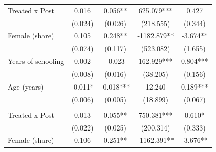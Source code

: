 \begin{table}[H]
{\begin{threeparttable}
\begin{tabular}[t]{lcccc}
        \hspace{1em}Treated x Post     & 0.016                 & 0.056**                        & 625.079***             & 0.427                       \\
        \hspace{1em}                   & (0.024)               & (0.026)                        & (218.555)              & (0.344)                     \\
        \hspace{1em}Female (share)     & 0.105                 & 0.248**                        & -1182.879**            & -3.674**                    \\
        \hspace{1em}                   & (0.074)               & (0.117)                        & (523.082)              & (1.655)                     \\
        \hspace{1em}Years of schooling & 0.002                 & -0.023                         & 162.929***             & 0.804***                    \\
        \hspace{1em}                   & (0.008)               & (0.016)                        & (38.205)               & (0.156)                     \\
        \hspace{1em}Age (years)        & -0.011*               & -0.018***                      & 12.240                 & 0.189***                    \\
        \hspace{1em}                   & (0.006)               & (0.005)                        & (18.899)               & (0.067)                     \\
        \addlinespace[0.3em]
        \multicolumn{5}{l}{\textit{Beta}}                                                                                                              \\
        \hspace{1em}Treated x Post     & 0.013                 & 0.055**                        & 750.381***             & 0.610*                      \\
        \hspace{1em}                   & (0.022)               & (0.025)                        & (200.314)              & (0.333)                     \\
        \hspace{1em}Female (share)     & 0.106                 & 0.251**                        & -1162.391**            & -3.676**                    \\

\end{tabular}
\end{threeparttable}}
\end{table}
